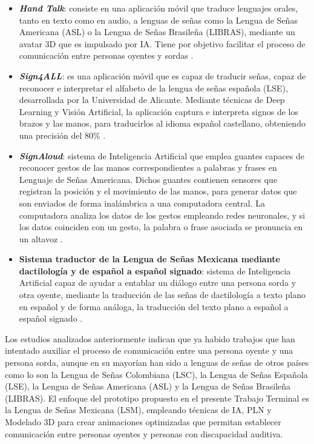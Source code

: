 \begin{itemize}
    \item \textbf{\textit{Hand Talk}}: consiste en una aplicación móvil que traduce lenguajes orales, tanto en texto como en audio, a lenguas de señas como la Lengua de Señas Americana (ASL) o la Lengua de Señas Brasileña (LIBRAS), mediante un avatar 3D que es impulsado por IA. Tiene por objetivo facilitar el proceso de comunicación entre personas oyentes y sordas \cite{ref12}. 
    \item \textbf{\textit{Sign4ALL}}: es una aplicación móvil que es capaz de traducir señas, capaz de reconocer e interpretar el alfabeto de la lengua de señas española (LSE), desarrollada por la Universidad de Alicante. Mediante técnicas de Deep Learning y Visión Artificial, la aplicación captura e interpreta signos de los brazos y las manos, para traducirlos al idioma español castellano, obteniendo una precisión del 80\% \cite{ref13}.
    \item \textbf{\textit{SignAloud}}: sistema de Inteligencia Artificial que emplea guantes capaces de reconocer gestos de las manos correspondientes a palabras y frases en Lenguaje de Señas Americana. Dichos guantes contienen sensores que registran la posición y el movimiento de las manos, para generar datos que son enviados de forma inalámbrica a una computadora central. La computadora analiza los datos de los gestos empleando redes neuronales, y si los datos coinciden con un gesto, la palabra o frase asociada se pronuncia en un altavoz \cite{ref14}.
    \item \textbf{Sistema traductor de la Lengua de Señas Mexicana mediante dactilología y de español a español signado}: sistema de Inteligencia Artificial capaz de ayudar a entablar un diálogo entre una persona sorda y otra oyente, mediante la traducción de las señas de dactilología a texto plano en español y de forma análoga, la traducción del texto plano a español a español signado \cite{ref15}.
\end{itemize}

Los estudios analizados anteriormente indican que ya habido trabajos que han intentado auxiliar el proceso de comunicación entre una persona oyente y una persona sorda, aunque en su mayorían han sido a lenguas de señas de otros países como lo son la Lengua de Señas Colombiana (LSC), la Lengua de Señas Española (LSE), la Lengua de Señas Americana (ASL) y la Lengua de Señas Brasileña (LIBRAS). El enfoque del prototipo propuesto en el presente Trabajo Terminal es la Lengua de Señas Mexicana (LSM), empleando técnicas de IA, PLN y Modelado 3D para crear animaciones optimizadas que permitan establecer comunicación entre personas oyentes y personas con discapacidad auditiva. \\

